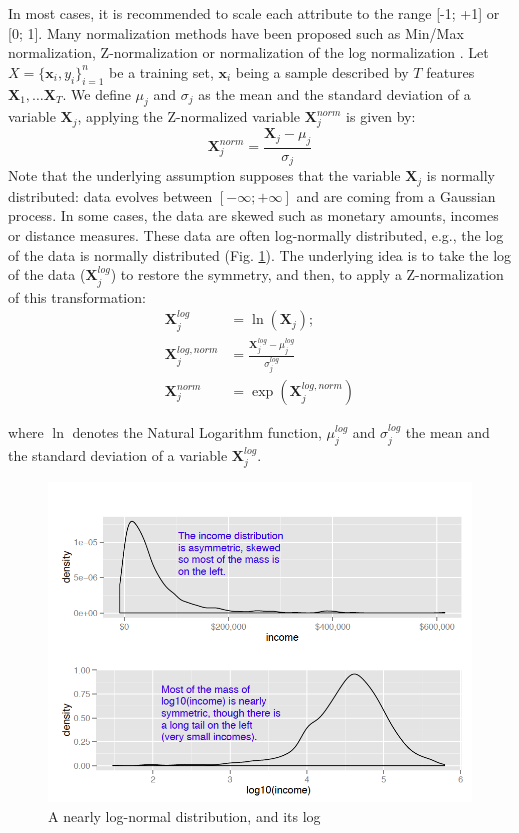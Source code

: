 In most cases, it is recommended to scale each attribute to the range [-1; +1] or [0; 1]. Many normalization methods have been proposed such as Min/Max normalization, Z-normalization or normalization of the log normalization . Let $X=\{\textbf{x}_i,y_i\}_{i=1}^n$ be a training set, $\textbf{x}_i$ being a sample described by $T$ features $\textbf{X}_1, \ldots \textbf{X}_T$. We define $\mu_j$ and $\sigma_j$ as the mean and the standard deviation of a variable $\textbf{X}_j$, applying the Z-normalized variable $\textbf{X}^{norm}_j$ is given by:
\begin{equation}
\textbf{X}^{norm}_j = \frac{\textbf{X}_j-\mu_j}{\sigma_j}
\end{equation}
Note that the underlying assumption supposes that the variable $\textbf{X}_j$ is normally distributed: data evolves between $[-\infty;+\infty]$ and are coming from a Gaussian process. In some cases, the data are skewed such as monetary amounts, incomes or distance measures. These data are often log-normally distributed, e.g., the log of the data is normally distributed (Fig. \ref{fig:SkewedData}). The underlying idea is to take the log of the data ($\textbf{X}^{log}_j$) to restore the symmetry, and then, to apply a Z-normalization of this transformation:
\begin{align}
\textbf{X}^{log}_j 		& = \ln(\textbf{X}_j); \\
\textbf{X}^{log,norm}_j & = \frac{\textbf{X}^{log}_j-\mu^{log}_j}{\sigma^{log}_j} \\
\textbf{X}^{norm}_j 	& = \exp(\textbf{X}^{log,norm}_j)
\end{align}

\noindent where $\ln$ denotes the Natural Logarithm function, $\mu^{log}_j$ and $\sigma^{log}_j$ the mean and the standard deviation of a variable $\textbf{X}^{log}_j$.

\begin{figure}
	\centering
	\includegraphics[width=0.6\linewidth]{images/SkewedData}
	\caption{A nearly log-normal distribution, and its log \protect\footnotemark}
	\label{fig:SkewedData}
\end{figure}

